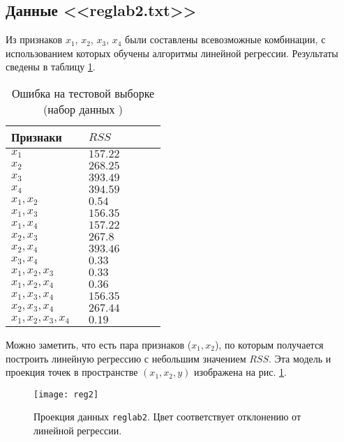 \documentclass[a4paper,12pt]{article} %
\begin{document}
\subsection{Данные <<reglab2.txt>>}

Из признаков $x_1$, $x_2$, $x_3$, $x_4$ были составлены всевозможные комбинации, с использованием которых обучены алгоритмы линейной регрессии.
Результаты сведены в таблицу \ref{table:reg2}.

\begin{table}[H]
    \caption{Ошибка на тестовой выборке (набор данных )}
    \begin{tabular}{m{0.45\linewidth} | m{0.45\linewidth}}
        \hline \hline
        Признаки & $ RSS $ \\
        \hline
        $ x_1 $ & $ 157.22 $ \\
        $ x_2 $ & $ 268.25 $ \\
        $ x_3 $ & $ 393.49 $ \\
        $ x_4 $ & $ 394.59 $ \\
        $ x_1, x_2 $ & $ 0.54 $ \\
        $ x_1, x_3 $ & $ 156.35 $ \\
        $ x_1, x_4 $ & $ 157.22 $ \\
        $ x_2, x_3 $ & $ 267.8 $ \\
        $ x_2, x_4 $ & $ 393.46 $ \\
        $ x_3, x_4 $ & $ 0.33 $ \\
        $ x_1, x_2, x_3 $ & $ 0.33 $ \\
        $ x_1, x_2, x_4 $ & $ 0.36 $ \\
        $ x_1, x_3, x_4 $ & $ 156.35 $ \\
        $ x_2, x_3, x_4 $ & $ 267.44 $ \\
        $ x_1, x_2, x_3, x_4 $ & $ 0.19 $ \\
        \hline
    \end{tabular}
    \label{table:reg2}
\end{table}

Можно заметить, что есть пара признаков ($x_1, x_2$), по которым получается построить линейную регрессию с небольшим значением $ RSS $.
Эта модель и проекция точек в пространстве $ (x_1, x_2, y) $ изображена на рис. \ref{fig:reg2}.

\begin{figure}[H]
    \centering \texttt{[image: reg2]}
    \caption{Проекция данных \texttt{reglab2}. Цвет соответствует отклонению от линейной регрессии.}
    \label{fig:reg2}
\end{figure}
\end{document}
